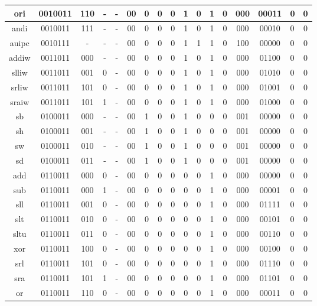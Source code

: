 \begin{longtable}{|c<{\raggedright}|c<{\raggedright}|c<{\raggedright}|c|c|c|c|c|c|c|c|c|c|c|c|p{0.3cm}|c|}
\hline
ori & 0010011 & 110 & - & - & 00 & 0 & 0 & 0 & 1 & 0 & 1 & 0 & 000 & 00011 & 0 & 0  \\
\hline
andi & 0010011 & 111 & - & - & 00 & 0 & 0 & 0 & 1 & 0 & 1 & 0 & 000 & 00010 & 0 & 0 \\
\hline
auipc & 0010111 & - & - & - & 00 & 0 & 0 & 0 & 1 & 1 & 1 & 0 & 100 & 00000 & 0 & 0 \\
\hline
addiw & 0011011 & 000 & - & - & 00 & 0 & 0 & 0 & 1 & 0 & 1 & 0 & 000 & 01100 & 0 & 0  \\
\hline
slliw & 0011011 & 001 & 0 & - & 00 & 0 & 0 & 0 & 1 & 0 & 1 & 0 & 000 & 01010 & 0 & 0  \\
\hline
srliw & 0011011 & 101 & 0 & - & 00 & 0 & 0 & 0 & 1 & 0 & 1 & 0 & 000 & 01001 & 0 & 0  \\
\hline
sraiw & 0011011 & 101 & 1 & - & 00 & 0 & 0 & 0 & 1 & 0 & 1 & 0 & 000 & 01000 & 0 & 0  \\
\hline
sb & 0100011 & 000 & - & - & 00 & 1 & 0 & 0 & 1 & 0 & 0 & 0 & 001 & 00000 & 0 & 0  \\
\hline
sh & 0100011 & 001 & - & - & 00 & 1 & 0 & 0 & 1 & 0 & 0 & 0 & 001 & 00000 & 0 & 0  \\
\hline
sw & 0100011 & 010 & - & - & 00 & 1 & 0 & 0 & 1 & 0 & 0 & 0 & 001 & 00000 & 0 & 0  \\
\hline
sd & 0100011 & 011 & - & - & 00 & 1 & 0 & 0 & 1 & 0 & 0 & 0 & 001 & 00000 & 0 & 0 \\
\hline
add & 0110011 & 000 & 0 & - & 00 & 0 & 0 & 0 & 0 & 0 & 1 & 0 & 000 & 00000 & 0 & 0  \\
\hline
sub & 0110011 & 000 & 1 & - & 00 & 0 & 0 & 0 & 0 & 0 & 1 & 0 & 000 & 00001 & 0 & 0  \\
\hline
sll & 0110011 & 001 & 0 & - & 00 & 0 & 0 & 0 & 0 & 0 & 1 & 0 & 000 & 01111 & 0 & 0  \\
\hline
slt & 0110011 & 010 & 0 & - & 00 & 0 & 0 & 0 & 0 & 0 & 1 & 0 & 000 & 00101 & 0 & 0  \\
\hline
sltu & 0110011 & 011 & 0 & - & 00 & 0 & 0 & 0 & 0 & 0 & 1 & 0 & 000 & 00110 & 0 & 0  \\
\hline
xor & 0110011 & 100 & 0 & - & 00 & 0 & 0 & 0 & 0 & 0 & 1 & 0 & 000 & 00100 & 0 & 0  \\
\hline
srl & 0110011 & 101 & 0 & - & 00 & 0 & 0 & 0 & 0 & 0 & 1 & 0 & 000 & 01110& 0 & 0  \\
\hline
sra & 0110011 & 101 & 1 & - & 00 & 0 & 0 & 0 & 0 & 0 & 1 & 0 & 000 & 01101 & 0 & 0  \\
\hline
or & 0110011 & 110 & 0 & - & 00 & 0 & 0 & 0 & 0 & 0 & 1 & 0 & 000 & 00011 & 0 & 0  \\

\end{longtable}
